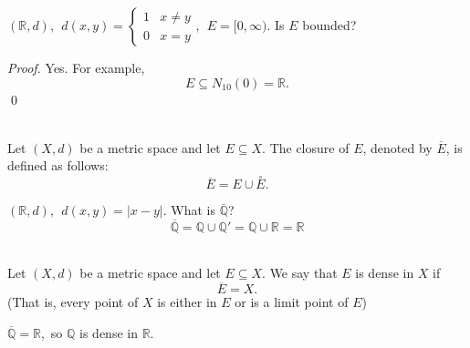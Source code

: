 \begin{example}
    $(\mathbb{R}, d), ~~d(x,y) = \begin{cases}1 & x\not = y \\ 0 &x=y\end{cases}, ~~E = [0, \infty)$. Is $E$ bounded?
\end{example}

\begin{proof}
    Yes. For example,
    $$E \subseteq N_{10}(0) = \mathbb{R}.$$
    \qed
\end{proof}

\begin{definition}[Closure] \leavevmode \\
    Let $(X, d)$ be a metric space and let $E\subseteq X.$
    The closure of $E$, denoted by $\overline{E}$, is defined as follows:
    $$\overline{E} = E \cup \overset{\circ}{E}.$$
\end{definition}

\begin{example}
    $(\mathbb{R}, d), ~~d(x,y) = |x-y|.$ What is $\overline{\mathbb{Q}}$?
    $$\overline{\mathbb{Q}} = \mathbb{Q} \cup \mathbb{Q'} = \mathbb{Q} \cup \mathbb{R} = \mathbb{R}$$
\end{example}

\begin{definition} [Dense] \leavevmode \\
    Let $(X, d)$ be a metric space and let $E \subseteq X.$
    We say that $E$ is dense in $X$ if
    $$\overline{E} = X.$$
    (That is, every point of $X$ is either in $E$ or is a limit point of $E$)
\end{definition}

\begin{example}
     $\overline{\mathbb{Q}} = \mathbb{R},$ so $\mathbb{Q}$ is dense in $\mathbb{R}.$
\end{example}
